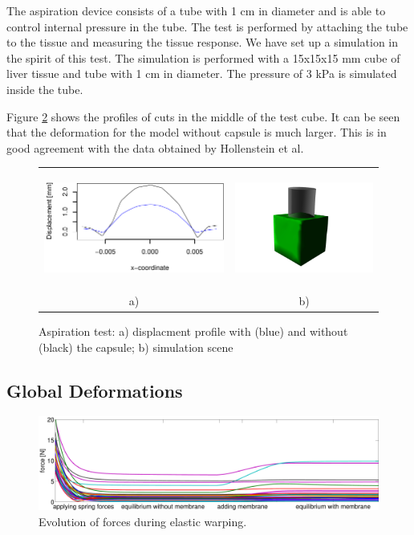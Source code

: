 \documentclass{llncs}
\begin{document}
The aspiration device consists of a tube with 1 cm in diameter and is able
to control internal pressure in the tube. The test is performed by
attaching the tube to the tissue and measuring the tissue response. We
have set up a simulation in the spirit of this test. 
The simulation is performed with a 15x15x15 mm cube of liver tissue and tube
with 1 cm in diameter. The pressure of 3 kPa is simulated inside the tube.

Figure \ref{fig-aspiration} shows the profiles of cuts in the middle of the
test cube. It can be seen that the
deformation for the model without capsule is much larger. This is in good
agreement with the data obtained by Hollenstein et al.

\begin{figure}[htb]
  \centering
  \begin{tabular}{cc}
    \includegraphics[width=3in]{aspiration.pdf} &
    \includegraphics[height=1.5in]{aspiration.jpg}\\
    a) & b)
  \end{tabular}

  \caption{\label{fig-aspiration}Aspiration test: a) displacment profile
  with (blue) and without (black) the capsule; b) simulation scene}
\end{figure}






\subsection{Global Deformations}

\begin{figure}[htb]
  \centering
    \includegraphics[width=.95\textwidth]{forceEvolution.pdf}
  \caption{\label{fig-aspiration}Evolution of forces during elastic warping.}
\end{figure}
\end{document}
